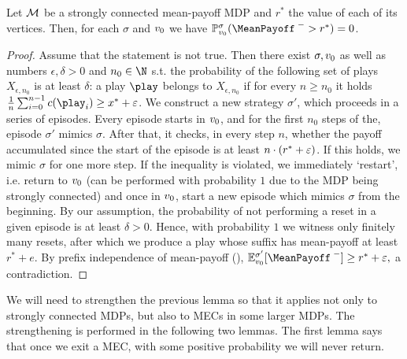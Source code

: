 \begin{lemma}
\label{5-lem:MEC-mp-strict-bound}
Let $\mathcal{M}$ be a strongly connected mean-payoff MDP and $r^*$ the value of each of its vertices. Then, for each $\sigma$ and $v_0$ we have $\probm^\sigma_{\vinit}(\MeanPayoffInf > r^*) = 0 $.
\end{lemma}
\begin{proof}
Assume that the statement is not true. Then there exist $\sigma,v_0$ as well as numbers $\epsilon,\delta>0 $ and $n_0 \in \N$ s.t. the probability of the following set of plays $X_{\epsilon,n_0}$ is at least $\delta$: a play $\play$ belongs to $X_{\epsilon,n_0}$ if for every $n\geq n_0$ it holds $\frac{1}{n}\sum_{i=0}^{n-1}\colouring(\play_i) \geq x^* + \eps$. We construct a new strategy $\sigma'$, which proceeds in a series of episodes. Every episode starts in $v_0$, and for the first $n_0$ steps of the, episode $\sigma'$ mimics $\sigma$. After that, it checks, in every step $n$, whether the payoff accumulated since the start of the episode is at least $n\cdot(r^* + \varepsilon)$. If this holds, we mimic $\sigma$ for one more step. If the inequality is violated, we immediately `restart', i.e. return to $v_0$ (can be performed with probability $1$ due to the MDP being strongly connected) and once in $v_0$, start a new episode which mimics $\sigma$ from the beginning. By our assumption, the probability of not performing a reset in a given episode is at least $\delta>0$. Hence, with probability $1$ we witness only finitely many resets, after which we produce a play whose suffix has mean-payoff at least $r^* + e$. By prefix independence of mean-payoff (), $\expv^{\sigma'}_{\vinit} [\MeanPayoffInf] \geq r^* + \eps,$ a contradiction.
\end{proof}

We will need to strengthen the previous lemma so that it applies not only to strongly connected MDPs, but also to MECs in some larger MDPs. The strengthening is performed in the following two lemmas. The first lemma says that once we exit a MEC, with some positive probability we will never return.

